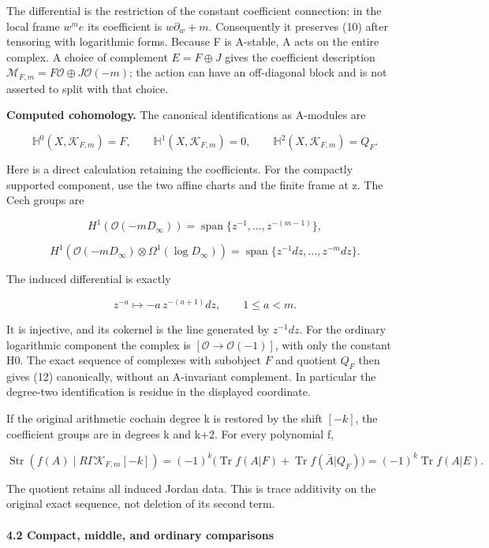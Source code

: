 The differential is the restriction of the constant coefficient connection: in the local frame \(w^m e\) its coefficient is \(w\partial_w+m\). Consequently it preserves (10) after tensoring with logarithmic forms. Because F is A-stable, A acts on the entire complex. A choice of complement \(E=F\oplus J\) gives the coefficient description \(\mathcal M_{F,m}=F\mathcal O\oplus J\mathcal O(-m)\); the action can have an off-diagonal block and is not asserted to split with that choice.

\textbf{Computed cohomology.} The canonical identifications as A-modules are

\[
\boxed{\mathbb H^0(X,\mathcal K_{F,m})=F,\qquad
\mathbb H^1(X,\mathcal K_{F,m})=0,\qquad
\mathbb H^2(X,\mathcal K_{F,m})=Q_F.}
\tag{12}
\]

Here is a direct calculation retaining the coefficients. For the compactly supported component, use the two affine charts and the finite frame at z. The Cech groups are

\[
H^1(\mathcal O(-mD_\infty))
=\operatorname{span}\{z^{-1},\ldots,z^{-(m-1)}\},
\]

\[
H^1(\mathcal O(-mD_\infty)\otimes\Omega^1(\log D_\infty))
=\operatorname{span}\{z^{-1}dz,\ldots,z^{-m}dz\}.
\]

The induced differential is exactly

\[
 z^{-a}\longmapsto-a\,z^{-(a+1)}dz,\qquad 1\le a<m.
\tag{13}
\]

It is injective, and its cokernel is the line generated by \(z^{-1}dz\). For the ordinary logarithmic component the complex is \([\mathcal O\to\mathcal O(-1)]\), with only the constant H0. The exact sequence of complexes with subobject \(F\) and quotient \(Q_F\) then gives (12) canonically, without an A-invariant complement. In particular the degree-two identification is residue in the displayed coordinate.

If the original arithmetic cochain degree k is restored by the shift \([-k]\), the coefficient groups are in degrees k and k+2. For every polynomial f,

\[
\boxed{\operatorname{Str}(f(A)\mid R\Gamma\mathcal K_{F,m}[-k])
=(-1)^k\bigl(\operatorname{Tr}f(A|F)+\operatorname{Tr}f(\bar A|Q_F)\bigr)
=(-1)^k\operatorname{Tr}f(A|E).}
\tag{14}
\]

The quotient retains all induced Jordan data. This is trace additivity on the original exact sequence, not deletion of its second term.

\paragraph{4.2 Compact, middle, and ordinary comparisons}\label{endpoint-exponential_original--compact-middle-and-ordinary-comparisons}

